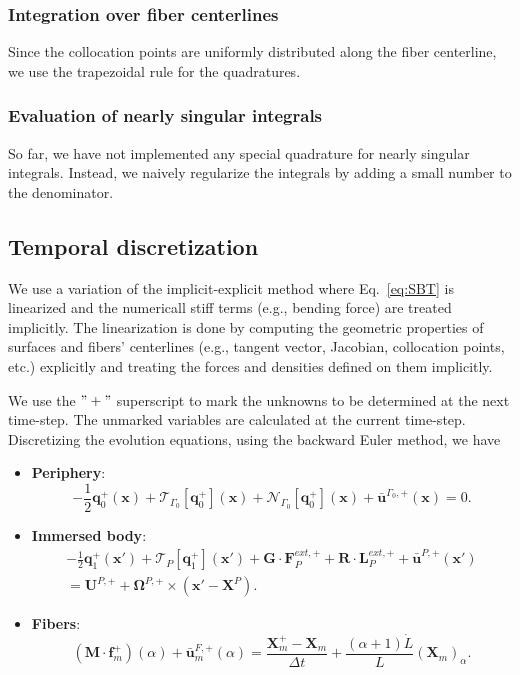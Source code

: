 \documentclass{article}
\newcommand{\OOmega}{\boldsymbol{\Omega}}
\newcommand{\UU}{\mathbf{U}}
\newcommand{\XX}{\mathbf{X}}
\newcommand{\RR}{\mathbf{R}}
\newcommand{\xx}{\mathbf{x}}
\newcommand{\qq}{\mathbf{q}}
\newcommand{\ubarFp}{\bar{\mathbf{u}}^{F,+}}
\newcommand{\ubarPp}{\bar{\mathbf{u}}^{P,+}}
\newcommand{\ubarGp}{\bar{\mathbf{u}}^{\Gamma_0,+}}
\newcommand{\ff}{\mathbf{f}}
\newcommand{\FF}{\mathbf{F}}
\newcommand{\GG}{\mathbf{G}}
\newcommand{\MM}{\mathbf{M}}
\newcommand{\calN}{\mathcal{N}}
\newcommand{\calT}{\mathcal{T}}
\newcommand{\LL}{\mathbf{L}}
\begin{document}
\subsubsection{Integration over fiber centerlines}
Since the collocation points are uniformly distributed along the fiber centerline, we use the trapezoidal rule for the quadratures.

\subsubsection{Evaluation of nearly singular integrals}
So far, we have not implemented any special quadrature for nearly singular integrals. Instead, we naively regularize the integrals by adding a small number to the denominator.

\subsection{Temporal discretization}
We use a variation of the implicit-explicit method where Eq.~\eqref{eq:SBT} is linearized and the numericall stiff terms (e.g., bending force) are treated implicitly. The linearization is done by computing the geometric properties of surfaces and fibers’ centerlines (e.g., tangent vector, Jacobian, collocation points, etc.) explicitly and treating the forces and densities defined on them implicitly.

We use the $"+"$ superscript to mark the unknowns to be determined at the next time-step. The unmarked variables are calculated at the current time-step. Discretizing the evolution equations, using the backward Euler method, we have

\begin{itemize}
    \item \textbf{Periphery}:
    \begin{equation}
     -\frac{1}{2}\qq^+_0(\xx) + \calT_{\Gamma_0}[\qq_0^+](\xx) + \calN_{\Gamma_0}[\qq_0^+](\xx) + \ubarGp(\xx) = 0.
    \end{equation}

    \item \textbf{Immersed body}:
    \begin{multline}
     -\frac{1}{2}\qq_1^+(\xx') + \calT_P [\qq_1^+](\xx') + \GG\cdot\FF^{ext,+}_{P} + \RR\cdot\LL^{ext,+}_{P} + \ubarPp(\xx') \\
     = \UU^{P,+} + \OOmega^{P,+} \times (\xx' - \XX^P).
    \end{multline}

    \item \textbf{Fibers}:
    \begin{equation}
      (\MM\cdot\ff_m^+)(\alpha) + \ubarFp_m (\alpha) = \frac{\XX_m^+ - \XX_m}{\Delta t} + \frac{(\alpha +1)\dot{L}}{L} (\XX_m)_{\alpha}.
    \end{equation}
\end{itemize}
\end{document}

